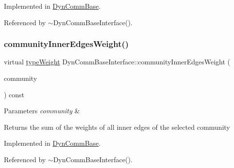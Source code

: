 Implemented in \hyperlink{classDynCommBase_a1ef408ec71d82b008fc0229416c77b61}{Dyn\+Comm\+Base}.



Referenced by $\sim$\+Dyn\+Comm\+Base\+Interface().

\mbox{\label{classDynCommBaseInterface_a0e68dcfcc55385ce60b000d76ccd2d86}} 
\subsubsection{\texorpdfstring{community\+Inner\+Edges\+Weight()}{communityInnerEdgesWeight()}}
{\footnotesize\ttfamily virtual \hyperlink{edge_8h_a2e7ea3be891ac8b52f749ec73fee6dd2}{type\+Weight} Dyn\+Comm\+Base\+Interface\+::community\+Inner\+Edges\+Weight (\begin{DoxyParamCaption}\item[{\hyperlink{graphUndirectedGroupable_8h_a914da95c9ea7f14f4b7f875c36818556}{type\+Community}}]{community }\end{DoxyParamCaption}) const\hspace{0.3cm}{\ttfamily [pure virtual]}}


\begin{DoxyParams}{Parameters}
{\em community} & \\
\hline
\end{DoxyParams}
\begin{DoxyReturn}{Returns}
the sum of the weights of all inner edges of the selected community 
\end{DoxyReturn}


Implemented in \hyperlink{classDynCommBase_ada91e7e914eb8be7f8c25f4c0c81156a}{Dyn\+Comm\+Base}.



Referenced by $\sim$\+Dyn\+Comm\+Base\+Interface().

\mbox{\label{classDynCommBaseInterface_a0985625f987f7f428d76f3baac54e398}} 
